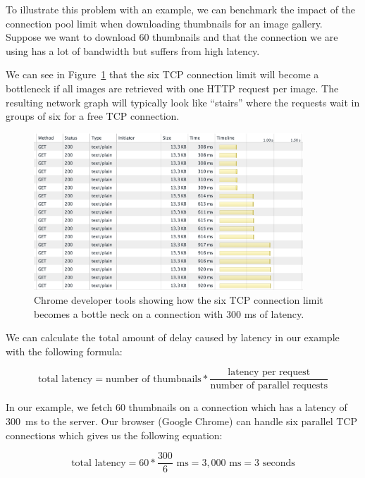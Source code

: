 \documentclass{cslthse-msc}
\begin{document}
To illustrate this problem with an example, we can benchmark the impact of the connection pool limit when downloading thumbnails for an image gallery. Suppose we want to download 60 thumbnails and that the connection we are using has a lot of bandwidth but suffers from high latency.

We can see in Figure~\ref{fig:tcp_bottleneck} that the six TCP connection limit will become a bottleneck if all images are retrieved with one HTTP request per image. The resulting network graph will typically look like \enquote{stairs} where the requests wait in groups of six for a free TCP connection.

\begin{figure}[H]
  \centering
    \begin{center}
      \includegraphics[width=0.9\textwidth]{images/chrome_latency_limit.png}
    \end{center}
  \caption{Chrome developer tools showing how the six TCP connection limit becomes a bottle neck on a connection with 300 ms of latency.}
  \label{fig:tcp_bottleneck}
\end{figure}

We can calculate the total amount of delay caused by latency in our example with the following formula:

\begin{equation}
\mbox{total latency} = \mbox{number of thumbnails} * \frac{\mbox{latency per request}}{\mbox{number of parallel requests}}
\end{equation}

In our example, we fetch 60 thumbnails on a connection which has a latency of 300~ms to the server. Our browser (Google Chrome) can handle six parallel TCP connections which gives us the following equation:

\begin{equation}
\mbox{total latency} = 60 * \frac{300}{6} \mbox{ ms}= 3,000 \mbox{ ms} = 3 \mbox{ seconds}
\end{equation}
\end{document}
